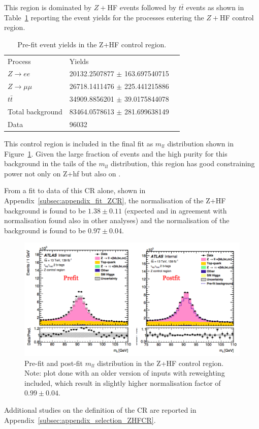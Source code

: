 This region is dominated by $Z+$HF events followed by $t\bar{t}$ events as shown in Table~\ref{tab:Yields_ZHF_prefit} reporting the event yields for the processes entering the $Z+$HF control region. 

\begin{table}[h]
  \centering
  \begin{tabular}{lll}
  \hline
  \hline
Process & Yields\\ 
$Z \rightarrow ee$ & 20132.2507877 $\pm$ 163.697540715\\
$Z \rightarrow \mu\mu$ & 26718.1411476 $\pm$ 225.441215886\\
$t\bar{t}$ & 34909.8856201 $\pm$ 39.0175844078\\
Total background &  83464.0578613 $\pm$ 281.699638149 \\
Data & 96032\\
\hline
\hline
\end{tabular}
 \caption{Pre-fit event yields in the Z+HF control region.}
  \label{tab:Yields_ZHF_prefit}
\end{table}


This control region is included in the final fit as $m_{ll}$ distribution shown in Figure~\ref{fig:mll_ZHF_prefit}. Given the large fraction of \ttbar events and the high purity for this background in the tails of the $m_{ll}$ distribution, this region has good constraining power not only on Z+hf but also on \ttbar.

From a fit to data of this CR alone, shown in Appendix~\ref{subsec:appendix_fit_ZCR}, the normalisation of the Z+HF background is found to be $1.38 \pm 0.11$ (expected and in agreement with normalisation found also in other analyses) and the normalisation of the \ttbar background is found to be $0.97 \pm 0.04$.

\begin{figure}
\centering
\includegraphics[width=.9\textwidth]{figures/selection/ZHF_mll}
\caption{Pre-fit and post-fit $m_{ll}$ distribution in the Z+HF control region. Note: plot done with an older version of inputs with \ttbar reweighting included, which result in slightly higher \ttbar normalisation factor of $0.99 \pm 0.04$.}
\label{fig:mll_ZHF_prefit}
\end{figure}

Additional studies on the definition of the CR are reported in Appendix~\ref{subsec:appendix_selection_ZHFCR}.
